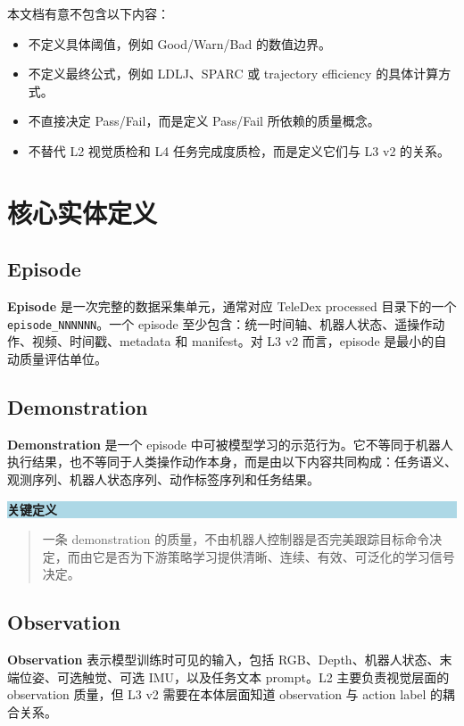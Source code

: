 \documentclass[UTF8,zihao=-4]{ctexart}
\newcommand{\Code}[1]{\texttt{#1}}
\newcommand{\Term}[1]{\textbf{#1}}
\newenvironment{notebox}[1]{\vspace{0.5em}\noindent\colorbox{LightBlue}{\parbox{0.96\linewidth}{\textbf{#1}}}\par\vspace{-0.2em}\begin{quote}\small}{\end{quote}\vspace{0.3em}}
\begin{document}
本文档有意不包含以下内容：
\begin{itemize}
  \item 不定义具体阈值，例如 Good/Warn/Bad 的数值边界。
  \item 不定义最终公式，例如 LDLJ、SPARC 或 trajectory efficiency 的具体计算方式。
  \item 不直接决定 Pass/Fail，而是定义 Pass/Fail 所依赖的质量概念。
  \item 不替代 L2 视觉质检和 L4 任务完成度质检，而是定义它们与 L3 v2 的关系。
\end{itemize}

\section{核心实体定义}

\subsection{Episode}

\Term{Episode} 是一次完整的数据采集单元，通常对应 TeleDex processed 目录下的一个 \Code{episode\_NNNNNN}。一个 episode 至少包含：统一时间轴、机器人状态、遥操作动作、视频、时间戳、metadata 和 manifest。对 L3 v2 而言，episode 是最小的自动质量评估单位。

\subsection{Demonstration}

\Term{Demonstration} 是一个 episode 中可被模型学习的示范行为。它不等同于机器人执行结果，也不等同于人类操作动作本身，而是由以下内容共同构成：任务语义、观测序列、机器人状态序列、动作标签序列和任务结果。

\begin{notebox}{关键定义}
一条 demonstration 的质量，不由机器人控制器是否完美跟踪目标命令决定，而由它是否为下游策略学习提供清晰、连续、有效、可泛化的学习信号决定。
\end{notebox}

\subsection{Observation}

\Term{Observation} 表示模型训练时可见的输入，包括 RGB、Depth、机器人状态、末端位姿、可选触觉、可选 IMU，以及任务文本 prompt。L2 主要负责视觉层面的 observation 质量，但 L3 v2 需要在本体层面知道 observation 与 action label 的耦合关系。
\end{document}
